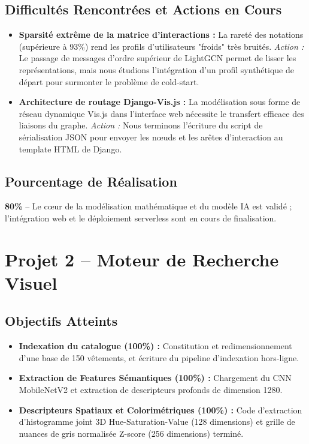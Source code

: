 \documentclass[12pt,a4paper]{article}
\begin{document}
\subsection{Difficultés Rencontrées et Actions en Cours}
\begin{itemize}
    \item \textbf{Sparsité extrême de la matrice d'interactions :} La rareté des notations (supérieure à 93\%) rend les profils d'utilisateurs "froids" très bruités.
    \textit{Action :} Le passage de messages d'ordre supérieur de LightGCN permet de lisser les représentations, mais nous étudions l'intégration d'un profil synthétique de départ pour surmonter le problème de cold-start.
    \item \textbf{Architecture de routage Django-Vis.js :} La modélisation sous forme de réseau dynamique Vis.js dans l'interface web nécessite le transfert efficace des liaisons du graphe.
    \textit{Action :} Nous terminons l'écriture du script de sérialisation JSON pour envoyer les nœuds et les arêtes d'interaction au template HTML de Django.
\end{itemize}

\subsection{Pourcentage de Réalisation}
\textbf{80\%} -- Le cœur de la modélisation mathématique et du modèle IA est validé ; l'intégration web et le déploiement serverless sont en cours de finalisation.

\newpage

\section{Projet 2 -- Moteur de Recherche Visuel}

\subsection{Objectifs Atteints}
\begin{itemize}
    \item \textbf{Indexation du catalogue (100\%) :} Constitution et redimensionnement d'une base de 150 vêtements, et écriture du pipeline d'indexation hors-ligne.
    \item \textbf{Extraction de Features Sémantiques (100\%) :} Chargement du CNN MobileNetV2 et extraction de descripteurs profonds de dimension 1280.
    \item \textbf{Descripteurs Spatiaux et Colorimétriques (100\%) :} Code d'extraction d'histogramme joint 3D Hue-Saturation-Value (128 dimensions) et grille de nuances de gris normalisée Z-score (256 dimensions) terminé.
\end{itemize}
\end{document}
